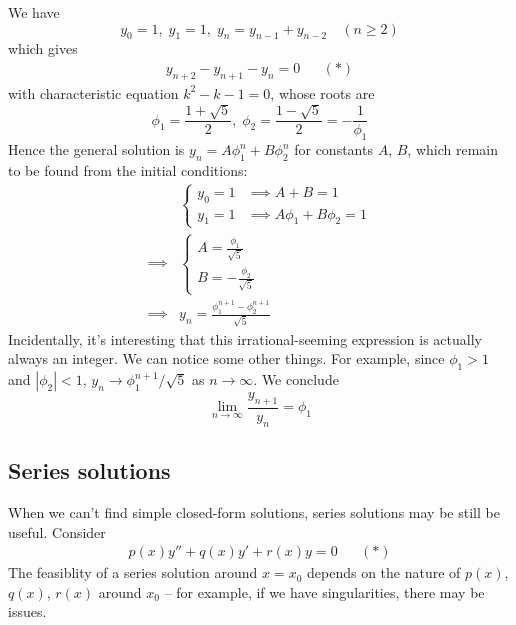 \documentclass{../../template/note}
\begin{document}
    \begin{example}
        We have
        \[  
            y_0 = 1, \; y_1 = 1, \; y_n = y_{n-1} + y_{n-2} \quad (n \geq 2)
        \]
        which gives
        \begin{align*}
            y_{n+2}-y_{n+1}-y_n = 0 && (*)
        \end{align*}
        with characteristic equation \(k^2 - k - 1 = 0\), whose roots are
        \[
            \phi_1 = \frac{1+\sqrt 5}{2}, \; \phi_2 = \frac{1 - \sqrt 5}{2} = -\frac{1}{\phi_1}
        \]
        Hence the general solution is \(y_n = A\phi_1^n + B\phi_2^n\) for constants \(A\), \(B\), which remain to be found from the initial conditions:
        \begin{align*}
            &\begin{cases}
                y_0 = 1 &\implies A + B = 1 \\
                y_1 = 1 &\implies A\phi_1 + B\phi_2 = 1
            \end{cases} \\
            \implies& \begin{cases}
                A = \frac{\phi_1}{\sqrt 5} \\
                B = -\frac{\phi_2}{\sqrt 5}
            \end{cases} \\
            \implies& y_n = \frac{\phi_1^{n+1} - \phi_2^{n+1}}{\sqrt 5}
        \end{align*}
        Incidentally, it's interesting that this irrational-seeming expression is actually always an integer. We can notice some other things. For example, since \(\phi_1 > 1\) and \(|\phi_2| < 1\), \(y_n \to \phi_1^{n+1}/\sqrt 5\) as \(n \to \infty\). We conclude
        \[
            \lim_{n \to \infty} \frac{y_{n+1}}{y_n} = \phi_1
        \]        
    \end{example}

    \subsection{Series solutions}

    When we can't find simple closed-form solutions, series solutions may be still be useful. Consider
    \begin{align*}
        p(x)y'' + q(x)y' + r(x)y = 0 && (*)
    \end{align*}
    The feasiblity of a series solution around \(x=x_0\) depends on the nature of \(p(x)\), \(q(x)\), \(r(x)\) around \(x_0\) -- for example, if we have singularities, there may be issues.
\end{document}
